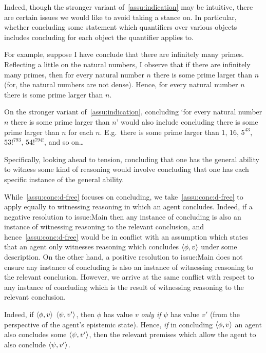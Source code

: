 \begin{note}
  Indeed, though the stronger variant of~\autoref{assu:indication} may be intuitive, there are certain issues we would like to avoid taking a stance on.
  In particular, whether concluding some statement which quantifiers over various objects includes concluding for each object the quantifier applies to.

  For example, suppose I have conclude that there are infinitely many primes.
  Reflecting a little on the natural numbers, I observe that if there are infinitely many primes, then for every natural number \(n\) there is some prime larger than \(n\) (for, the natural numbers are not dense).
  Hence, for every natural number \(n\) there is some prime larger than \(n\).

  On the stronger variant of~\autoref{assu:indication}, concluding `for every natural number \(n\) there is some prime larger than \(n\)' would also include concluding there is some prime larger than \(n\) for each \(n\).
  E.g.\ there is some prime larger than \(1\), \(16\), \(5^{43}\), \(53!^{793}\), \(54!^{794!}\), and so on\dots

  Specifically, looking ahead to tension, concluding that one has the general ability to witness some kind of reasoning would involve concluding that one has each specific instance of the general ability.
\end{note}

\begin{note}[Witnessing]
    While~\autoref{assu:conc:d-free} focuses on concluding, we take~\autoref{assu:conc:d-free} to apply equally to witnessing reasoning in which an agent concludes.
  Indeed, if a negative resolution to {\color{red} issue:Main} then any instance of concluding is also an instance of witnessing reasoning to the relevant conclusion, and hence~\autoref{assu:conc:d-free} would be in conflict with an assumption which states that an agent only witnesses reasoning which concludes \(\langle \phi, v \rangle\) under some description.
  On the other hand, a positive resolution to {\color{red} issue:Main} does not ensure any instance of concluding is also an instance of witnessing reasoning to the relevant conclusion.
  However, we arrive at the same conflict with respect to any instance of concluding which is the result of witnessing reasoning to the relevant conclusion.

  Indeed, if \(\langle \phi, v \rangle\) \indicatePr{} \(\langle \psi, v' \rangle\), then \(\phi\) has value \(v\) \emph{only if} \(\psi\) has value \(v'\) (from the perspective of the agent's epistemic state).
  Hence, \emph{if} in concluding \(\langle \phi, v \rangle\) an agent also concludes some \indicateVed{} \(\langle \psi, v' \rangle\), then the relevant premises which allow the agent to also conclude \(\langle \psi, v' \rangle\).
\end{note}

